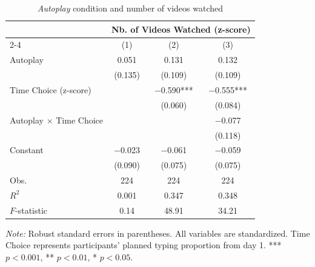 \documentclass[11pt,a4paper,oneside]{article}
\begin{document}
\begin{table}[H]
  \centering
  \caption{\textit{Autoplay} condition and number of videos watched}
  \begin{threeparttable}
  \begin{tabular*}{\textwidth}{@{\extracolsep{\fill}}lccc}
  \toprule
  & \multicolumn{3}{c}{Nb. of Videos Watched (z-score)} \\
  \cmidrule(lr){2-4}
  & (1) & (2) & (3) \\
  \midrule
  Autoplay & 0.051 & 0.131 & 0.132 \\
  & (0.135) & (0.109) & (0.109) \\
  Time Choice (z-score) & & $-$0.590*** & $-$0.555*** \\
  & & (0.060) & (0.084) \\
  Autoplay × Time Choice & & & $-$0.077 \\
  & & & (0.118) \\
  Constant & $-$0.023 & $-$0.061 & $-$0.059 \\
  & (0.090) & (0.075) & (0.075) \\
  \midrule
  Obs. & 224 & 224 & 224 \\
  $R^2$ & 0.001 & 0.347 & 0.348 \\
  $F$-statistic & 0.14 & 48.91 & 34.21 \\
  \bottomrule
  \end{tabular*}
  \begin{tablenotes}[flushleft]
  \footnotesize
  \item[] \textit{Note:} Robust standard errors in parentheses. All variables are standardized. Time Choice represents participants' planned typing proportion from day 1. *** $p<0.001$, ** $p<0.01$, * $p<0.05$.
  \end{tablenotes}
  \end{threeparttable}
  \label{tab:videos_regressions_full}
\end{table}
\end{document}
